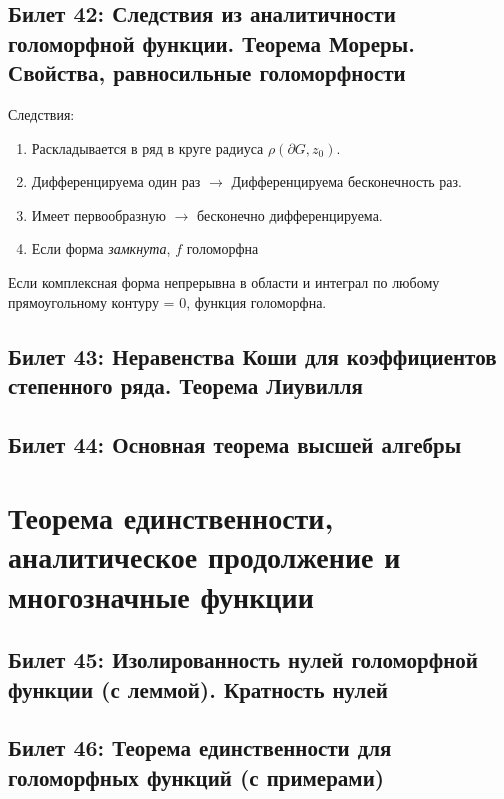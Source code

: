 \documentclass[12pt, a4paper, oneside]{memoir}
\begin{document}
\subsection{Билет 42: Следствия из аналитичности голоморфной функции. Теорема Мореры. Свойства, равносильные голоморфности}

Следствия:

\begin{enumerate}
    \item Раскладывается в ряд в круге радиуса $\rho(\partial G, z_0)$.
    \item Дифференцируема один раз $→$ Дифференцируема бесконечность раз.
    \item Имеет первообразную $→$ бесконечно дифференцируема.
    \item Если форма \textit{замкнута}, $f$ голоморфна 
\end{enumerate}


\begin{theorem}
    [Мореры]

    Если комплексная форма непрерывна в области и интеграл по любому прямоугольному контуру = 0, функция голоморфна.
\end{theorem}

\subsection{Билет 43: Неравенства Коши для коэффициентов степенного ряда. Теорема Лиувилля}

\subsection{Билет 44: Основная теорема высшей алгебры}




\section{Теорема единственности, аналитическое продолжение и многозначные функции}


\subsection{Билет 45: Изолированность нулей голоморфной функции (с леммой). Кратность нулей}

\subsection{Билет 46: Теорема единственности для голоморфных функций (с примерами)}
\end{document}
